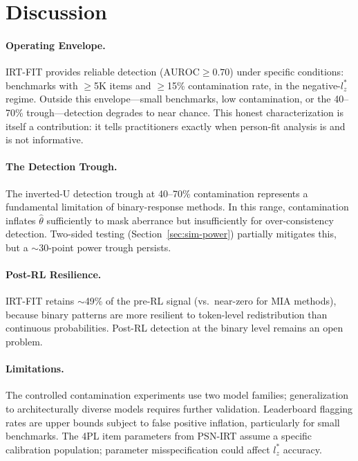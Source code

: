 \documentclass[11pt,a4paper]{article}
\begin{document}
\section{Discussion}

\paragraph{Operating Envelope.}
IRT-FIT provides reliable detection ($\text{AUROC}\geq0.70$) under specific conditions: benchmarks with $\geq$5K items and $\geq$15\% contamination rate, in the negative-$l_{z}^{*}$ regime.
Outside this envelope---small benchmarks, low contamination, or the 40--70\% trough---detection degrades to near chance.
This honest characterization is itself a contribution: it tells practitioners exactly when person-fit analysis is and is not informative.

\paragraph{The Detection Trough.}
The inverted-U detection trough at 40--70\% contamination represents a fundamental limitation of binary-response methods.
In this range, contamination inflates $\hat{\theta}$ sufficiently to mask aberrance but insufficiently for over-consistency detection.
Two-sided testing (Section~\ref{sec:sim-power}) partially mitigates this, but a $\sim$30-point power trough persists.

\paragraph{Post-RL Resilience.}
IRT-FIT retains $\sim$49\% of the pre-RL signal (vs.\ near-zero for MIA methods), because binary patterns are more resilient to token-level redistribution than continuous probabilities.
Post-RL detection at the binary level remains an open problem.

\paragraph{Limitations.}
The controlled contamination experiments use two model families; generalization to architecturally diverse models requires further validation.
Leaderboard flagging rates are upper bounds subject to false positive inflation, particularly for small benchmarks.
The 4PL item parameters from PSN-IRT assume a specific calibration population; parameter misspecification could affect $l_{z}^{*}$ accuracy.
\end{document}
